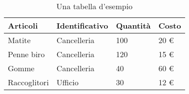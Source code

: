 \usepackage{eurosym} %
\begin{table}[H]
\centering
\begin{tabular}{|l|l|l|l|} %
\hline %
Articoli      & Identificativo & Quantità & Costo \\
\hline
Matite        & Cancelleria    & 100      & 20 \euro{}\\
\hline
Penne biro    & Cancelleria    & 120      & 15 \euro{}\\
\hline
Gomme         & Cancelleria    & 40       & 60 \euro{}\\
\hline
Raccoglitori  & Ufficio        & 30       & 12 \euro{}\\
\hline
\end{tabular}
\caption{Una tabella d'esempio}
\label{tabella:esempio2}
\end{table}
